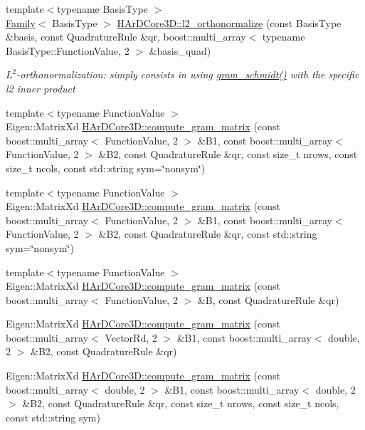 \begin{DoxyCompactItemize}
{\footnotesize template$<$typename Basis\+Type $>$ }\\\hyperlink{classHArDCore3D_1_1Family}{Family}$<$ Basis\+Type $>$ \hyperlink{group__Basis_ga087cb67abbfba7c2d90f67a4e05abc20}{H\+Ar\+D\+Core3\+D\+::l2\+\_\+orthonormalize} (const Basis\+Type \&basis, const Quadrature\+Rule \&qr, boost\+::multi\+\_\+array$<$ typename Basis\+Type\+::\+Function\+Value, 2 $>$ \&basis\+\_\+quad)
\begin{DoxyCompactList}\small\item\em $L^2$-\/orthonormalization\+: simply consists in using \hyperlink{group__Basis_ga5452c71e3652aa957d105446a95826e8}{gram\+\_\+schmidt()} with the specific l2 inner product \end{DoxyCompactList}\item 
{\footnotesize template$<$typename Function\+Value $>$ }\\Eigen\+::\+Matrix\+Xd \hyperlink{group__Basis_ga224969a8de049faa61bc39d3975bb237}{H\+Ar\+D\+Core3\+D\+::compute\+\_\+gram\+\_\+matrix} (const boost\+::multi\+\_\+array$<$ Function\+Value, 2 $>$ \&B1, const boost\+::multi\+\_\+array$<$ Function\+Value, 2 $>$ \&B2, const Quadrature\+Rule \&qr, const size\+\_\+t nrows, const size\+\_\+t ncols, const std\+::string sym=\char`\"{}nonsym\char`\"{})
\item 
{\footnotesize template$<$typename Function\+Value $>$ }\\Eigen\+::\+Matrix\+Xd \hyperlink{group__Basis_ga9385a57c81b496ebabea12f8d3c2f068}{H\+Ar\+D\+Core3\+D\+::compute\+\_\+gram\+\_\+matrix} (const boost\+::multi\+\_\+array$<$ Function\+Value, 2 $>$ \&B1, const boost\+::multi\+\_\+array$<$ Function\+Value, 2 $>$ \&B2, const Quadrature\+Rule \&qr, const std\+::string sym=\char`\"{}nonsym\char`\"{})
\item 
{\footnotesize template$<$typename Function\+Value $>$ }\\Eigen\+::\+Matrix\+Xd \hyperlink{group__Basis_gacecea1b90076ee784d7950da4d31749f}{H\+Ar\+D\+Core3\+D\+::compute\+\_\+gram\+\_\+matrix} (const boost\+::multi\+\_\+array$<$ Function\+Value, 2 $>$ \&B, const Quadrature\+Rule \&qr)
\item 
Eigen\+::\+Matrix\+Xd \hyperlink{group__Basis_gaf5cc3ed71949b5d7adc5877e6bfebcb4}{H\+Ar\+D\+Core3\+D\+::compute\+\_\+gram\+\_\+matrix} (const boost\+::multi\+\_\+array$<$ Vector\+Rd, 2 $>$ \&B1, const boost\+::multi\+\_\+array$<$ double, 2 $>$ \&B2, const Quadrature\+Rule \&qr)
\item 
Eigen\+::\+Matrix\+Xd \hyperlink{group__Basis_gac574f3b532690c1d59b2bfc48023ab3b}{H\+Ar\+D\+Core3\+D\+::compute\+\_\+gram\+\_\+matrix} (const boost\+::multi\+\_\+array$<$ double, 2 $>$ \&B1, const boost\+::multi\+\_\+array$<$ double, 2 $>$ \&B2, const Quadrature\+Rule \&qr, const size\+\_\+t nrows, const size\+\_\+t ncols, const std\+::string sym)

\end{DoxyCompactItemize}
